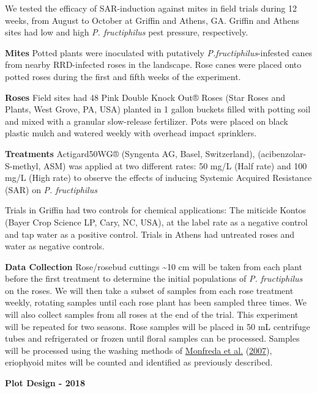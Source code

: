 \documentclass[12pt,final,CPage]{ufthesis}
\begin{document}
{  We tested the efficacy of SAR-induction against mites in field trials during 12 weeks, from August to October at Griffin and Athens, GA. Griffin and Athens sites had low and high \emph{P. fructiphilus} pest pressure, respectively.

  \textbf{Mites}
  Potted plants were inoculated with putatively \emph{P.fructiphilus}-infested canes from nearby RRD-infected roses in the landscape. Rose canes were placed onto potted roses during the first and fifth weeks of the experiment.

  \textbf{Roses}
  Field sites had 48 Pink Double Knock Out® Roses (Star Roses and Plants, West Grove, PA, USA) planted in 1 gallon buckets filled with potting soil and mixed with a granular slow-release fertilizer. Pots were placed on black plastic mulch and watered weekly with overhead impact sprinklers.

  \textbf{Treatments}
  Actigard50WG® (Syngenta AG, Basel, Switzerland), (acibenzolar-S-methyl, ASM) was applied at two different rates: 50 \si{\milli\gram}/\si{\liter} (Half rate) and 100 \si{\milli\gram}/\si{\liter} (High rate) to observe the effects of inducing Systemic Acquired Resistance (SAR) on \emph{P. fructiphilus}

  Trials in Griffin had two controls for chemical applications: The miticide Kontos (Bayer Crop Science LP, Cary, NC, USA), at the label rate as a negative control and tap water as a positive control. Trials in Athens had untreated roses and water as negative controls.

  \textbf{Data Collection}
  Rose/rosebud cuttings \textasciitilde10 cm will be taken from each plant before the first treatment to determine the initial populations of \emph{P. fructiphilus} on the roses. We will then take a subset of samples from each rose treatment weekly, rotating samples until each rose plant has been sampled three times. We will also collect samples from all roses at the end of the trial. This experiment will be repeated for two seasons. Rose samples will be placed in 50 mL centrifuge tubes and refrigerated or frozen until floral samples can be processed. Samples will be processed using the washing methods of \protect\hyperlink{ref-Monfreda2007}{Monfreda et al.} (\protect\hyperlink{ref-Monfreda2007}{2007}), eriophyoid mites will be counted and identified as previously described.

  \textbf{Plot Design - 2018}
  \begin{figure}


\end{figure}}
\end{document}
